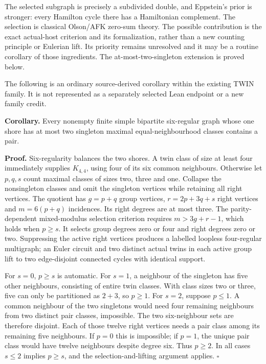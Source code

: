 \documentclass[
  11pt,
]{article}
\newcounter{none} %
\begin{document}
The selected subgraph is precisely a subdivided double, and Eppstein's
prior is stronger: every Hamilton cycle there has a Hamiltonian
complement. The selection is classical Olson/AFK zero-sum theory. The
possible contribution is the exact actual-host criterion and its
formalization, rather than a new counting principle or Eulerian lift.
Its priority remains unresolved and it may be a routine corollary of
those ingredients. The at-most-two-singleton extension is proved below.

The following is an ordinary source-derived corollary within the
existing TWIN family. It is not represented as a separately selected
Lean endpoint or a new family credit.

\textbf{Corollary.} Every nonempty finite simple bipartite six-regular
graph whose one shore has at most two singleton maximal
equal-neighbourhood classes contains a pair.

\textbf{Proof.} Six-regularity balances the two shores. A twin class of
size at least four immediately supplies \(K_{4,4}\), using four of its
six common neighbours. Otherwise let \(p,q,s\) count maximal classes of
sizes two, three and one. Collapse the nonsingleton classes and omit the
singleton vertices while retaining all right vertices. The quotient has
\(g=p+q\) group vertices, \(r=2p+3q+s\) right vertices and \(m=6(p+q)\)
incidences. Its right degrees are at most three. The parity-dependent
mixed-modulus selection criterion requires \(m>3g+r-1\), which holds
when \(p\ge s\). It selects group degrees zero or four and right degrees
zero or two. Suppressing the active right vertices produces a labelled
loopless four-regular multigraph; an Euler circuit and two distinct
actual twins in each active group lift to two edge-disjoint connected
cycles with identical support.

For \(s=0\), \(p\ge s\) is automatic. For \(s=1\), a neighbour of the
singleton has five other neighbours, consisting of entire twin classes.
With class sizes two or three, five can only be partitioned as \(2+3\),
so \(p\ge1\). For \(s=2\), suppose \(p\le1\). A common neighbour of the
two singletons would need four remaining neighbours from two distinct
pair classes, impossible. The two six-neighbour sets are therefore
disjoint. Each of those twelve right vertices needs a pair class among
its remaining five neighbours. If \(p=0\) this is impossible; if
\(p=1\), the unique pair class would have twelve neighbours despite
degree six. Thus \(p\ge2\). In all cases \(s\le2\) implies \(p\ge s\),
and the selection-and-lifting argument applies. \(\square\)
\end{document}
